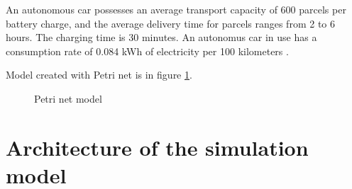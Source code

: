 \documentclass[a4paper, 11pt, a4paper]{article}
\begin{document}
An autonomous car possesses an average transport capacity of 600 parcels per battery charge, and the average delivery time for parcels ranges 
from 2 to 6 hours. The charging time is 30 minutes. An autonomus car in use has a consumption rate of 0.084 kWh of electricity per 100 kilometers \cite{autonomous.emissions}.

Model created with Petri net is in figure \ref{figure:scheme}.

\begin{figure}[ht]
    \begin{center}
    \end{center}
    \caption{Petri net model}
    \label{figure:scheme}
\end{figure}


\section{Architecture of the simulation model}
\end{document}
